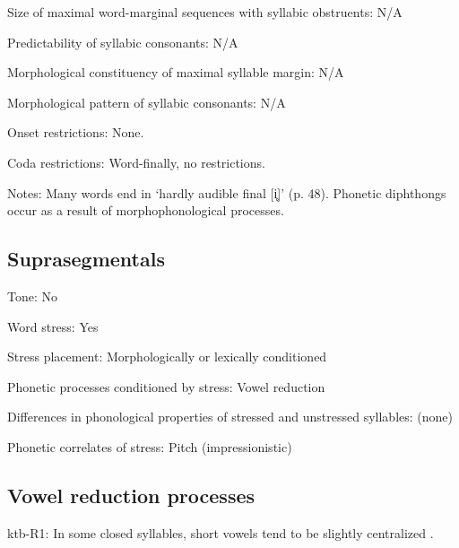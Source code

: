 {\begin{appendixdesc}
\item[Size of maximal word-marginal sequences with syllabic obstruents:] N/A

\item[Predictability of syllabic consonants:] N/A

\item[Morphological constituency of maximal syllable margin:] N/A

\item[Morphological pattern of syllabic consonants:] N/A

\item[Onset restrictions:] None.

\item[Coda restrictions:] Word-finally, no restrictions.

\item[Notes:] Many words end in ‘hardly audible final [i̥]’ (p. 48). Phonetic diphthongs occur as a result of morphophonological processes.
\end{appendixdesc}
\subsection*{Suprasegmentals}
\begin{appendixdesc}
\item[Tone:] No

\item[Word stress:] Yes

\item[Stress placement:] Morphologically or lexically conditioned

\item[Phonetic processes conditioned by stress:] Vowel reduction

\item[Differences in phonological properties of stressed and unstressed syllables:] (none)

\item[Phonetic correlates of stress:] Pitch (impressionistic)
\end{appendixdesc}
\subsection*{Vowel reduction processes}
\begin{appendixdesc}

\item[ktb-R1:] In some closed syllables, short vowels tend to be slightly centralized \citep[18]{Treis2008}.


\end{appendixdesc}}
